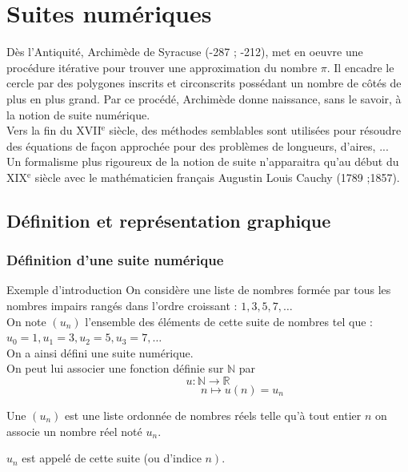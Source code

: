 \chapter{Suites numériques}
\thispagestyle{fancy}

\begin{bhistoire}
	Dès l'Antiquité, Archimède de Syracuse (-287 ; -212), met en oeuvre une procédure itérative pour trouver une approximation du nombre $\pi$. Il encadre le cercle par des polygones inscrits et circonscrits possédant un nombre de côtés de plus en plus grand. Par ce procédé,
	Archimède donne naissance, sans le savoir, à la notion de suite numérique.\\
	Vers la fin du XVII$^\text{e}$ siècle, des méthodes semblables sont utilisées pour résoudre des équations de façon approchée pour des problèmes de longueurs, d'aires, ...\\
	Un formalisme plus rigoureux de la notion de suite n'apparaitra qu'au début du XIX$^\text{e}$ siècle avec le mathématicien français Augustin Louis Cauchy (1789 ;1857).
\end{bhistoire}


\section{Définition et représentation graphique}

\subsection{Définition d'une suite numérique}

\begin{bexemplet}{Exemple d'introduction}
On considère une liste de nombres formée par tous les nombres impairs rangés dans l'ordre croissant : $1,3,5,7, \ldots$\\
On note $\left(u_{n}\right)$ l'ensemble des éléments de cette suite de nombres tel que :\\
$u_{0}=1, u_{1}=3, u_{2}=5, u_{3}=7, \ldots$\\
On a ainsi défini une suite numérique.\\
On peut lui associer une fonction définie sur $\mathbb{N}$ par 
$$u: \mathbb{N} \rightarrow \mathbb{R}$$
$$\phantom{......................}n \mapsto u(n)=u_{n}$$

\end{bexemplet}

\begin{bdefi}
\begin{itemDef}
\item Une  $\left(u_{n}\right)$ est une liste ordonnée de nombres réels telle qu'à tout entier $n$ on associe un nombre réel noté $u_{n}$.
\item $u_{n}$ est appelé  de cette suite (ou d'indice $\left.n\right)$.
\end{itemDef}
\end{bdefi}

